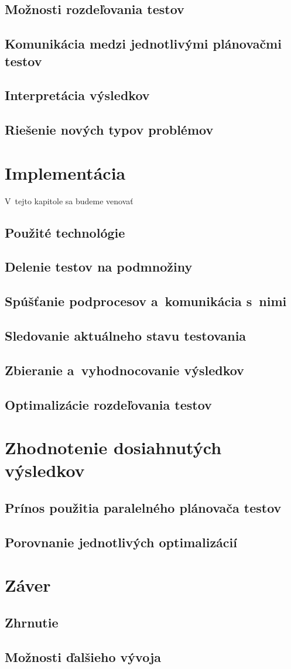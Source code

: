 \section{Možnosti rozdeľovania testov}
\section{Komunikácia medzi jednotlivými plánovačmi testov}
\section{Interpretácia výsledkov}
\section{Riešenie nových typov problémov}


\chapter{Implementácia}
V~tejto kapitole sa budeme venovať 
\section{Použité technológie}
\section{Delenie testov na podmnožiny}
\section{Spúšťanie podprocesov a~komunikácia s~nimi}
\section{Sledovanie aktuálneho stavu testovania}
\section{Zbieranie a~vyhodnocovanie výsledkov}
\section{Optimalizácie rozdeľovania testov}


\chapter{Zhodnotenie dosiahnutých výsledkov}
\section{Prínos použitia paralelného plánovača testov}
\section{Porovnanie jednotlivých optimalizácií}


\chapter{Záver}
\section{Zhrnutie}
\section{Možnosti ďalšieho vývoja}

